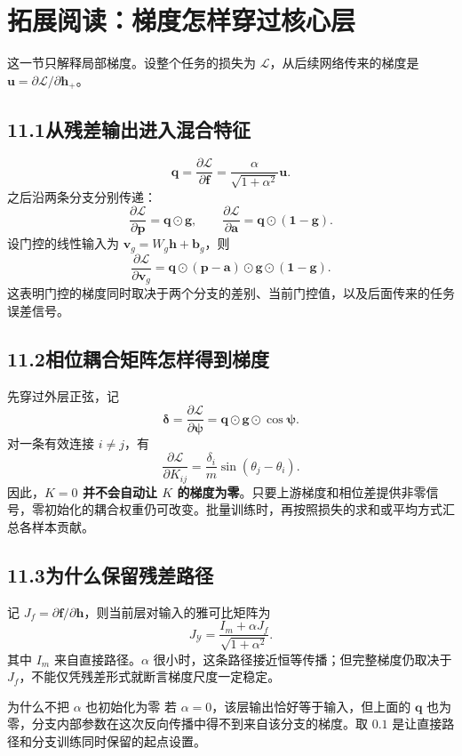 \documentclass[UTF8,11pt,a4paper,fontset=fandol]{ctexart}
\newcommand{\YLayer}{\mathcal{Y}}
\newcommand{\newsection}[1]{\clearpage\section{#1}}
\begin{document}
\newsection{拓展阅读：梯度怎样穿过核心层}
这一节只解释局部梯度。设整个任务的损失为 $\mathcal L$，从后续网络传来的梯度是 $\boldsymbol{u}=\partial\mathcal L/\partial\boldsymbol{h}_{+}$。
\subsection*{11.1\quad 从残差输出进入混合特征}
\[
\boxed{\boldsymbol{q}=\frac{\partial\mathcal L}{\partial\boldsymbol{f}}
=\frac{\alpha}{\sqrt{1+\alpha^2}}\boldsymbol{u}.}
\]
之后沿两条分支分别传递：
\[
\frac{\partial\mathcal L}{\partial\boldsymbol{p}}
=\boldsymbol{q}\odot\boldsymbol{g},\qquad
\frac{\partial\mathcal L}{\partial\boldsymbol{a}}
=\boldsymbol{q}\odot(\boldsymbol{1}-\boldsymbol{g}).
\]
设门控的线性输入为 $\boldsymbol{v}_g=W_g\boldsymbol{h}+\boldsymbol{b}_g$，则
\[
\frac{\partial\mathcal L}{\partial\boldsymbol{v}_g}
=\boldsymbol{q}\odot(\boldsymbol{p}-\boldsymbol{a})
\odot\boldsymbol{g}\odot(\boldsymbol{1}-\boldsymbol{g}).
\]
这表明门控的梯度同时取决于两个分支的差别、当前门控值，以及后面传来的任务误差信号。
\subsection*{11.2\quad 相位耦合矩阵怎样得到梯度}
先穿过外层正弦，记
\[
\boldsymbol{\delta}=\frac{\partial\mathcal L}{\partial\boldsymbol{\psi}}
=\boldsymbol{q}\odot\boldsymbol{g}\odot\cos\boldsymbol{\psi}.
\]
对一条有效连接 $i\ne j$，有
\begin{equation}
\boxed{\frac{\partial\mathcal L}{\partial K_{ij}}
=\frac{\delta_i}{m}\sin(\theta_j-\theta_i).}
\end{equation}
因此，\textbf{$K=0$ 并不会自动让 $K$ 的梯度为零}。只要上游梯度和相位差提供非零信号，零初始化的耦合权重仍可改变。批量训练时，再按照损失的求和或平均方式汇总各样本贡献。
\subsection*{11.3\quad 为什么保留残差路径}
记 $J_f=\partial\boldsymbol{f}/\partial\boldsymbol{h}$，则当前层对输入的雅可比矩阵为
\begin{equation}
\boxed{J_{\YLayer}=\frac{I_m+\alpha J_f}{\sqrt{1+\alpha^2}}.}
\end{equation}
其中 $I_m$ 来自直接路径。$\alpha$ 很小时，这条路径接近恒等传播；但完整梯度仍取决于 $J_f$，不能仅凭残差形式就断言梯度尺度一定稳定。
\begin{notebox}{为什么不把 $\alpha$ 也初始化为零}
若 $\alpha=0$，该层输出恰好等于输入，但上面的 $\boldsymbol{q}$ 也为零，分支内部参数在这次反向传播中得不到来自该分支的梯度。取 $0.1$ 是让直接路径和分支训练同时保留的起点设置。
\end{notebox}
\end{document}
